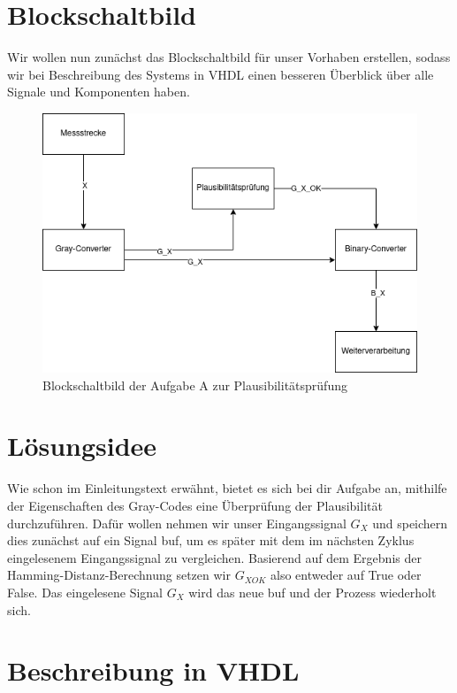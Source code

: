 \documentclass{report}
\begin{document}
\section{Blockschaltbild}
\label{sec:blockschaltbild}

Wir wollen nun zunächst das Blockschaltbild für unser Vorhaben erstellen, sodass wir bei Beschreibung des Systems in VHDL einen besseren Überblick über alle Signale und Komponenten haben.

\begin{figure}[h]
  \centering
  \includegraphics[width=\textwidth]{../assets/images/DIHA/blockschaltbilda.png}
  \caption{Blockschaltbild der Aufgabe A zur Plausibilitätsprüfung}
  \label{fig:blockA}
\end{figure}

\section{Lösungsidee}
\label{sec:losungsidee}

Wie schon im Einleitungstext erwähnt, bietet es sich bei dir Aufgabe an, mithilfe der Eigenschaften des Gray-Codes eine Überprüfung der Plausibilität durchzuführen. Dafür wollen nehmen wir unser Eingangssignal $G_{X}$ und speichern dies zunächst auf ein Signal buf, um es später mit dem im nächsten Zyklus eingelesenem Eingangssignal zu vergleichen. Basierend auf dem Ergebnis der Hamming-Distanz-Berechnung setzen wir $G_{XOK}$ also entweder auf True oder False. Das eingelesene Signal $G_{X}$ wird das neue buf und der Prozess wiederholt sich.

\section{Beschreibung in VHDL}
\label{sec:beschreibung-vhdl}
\end{document}
